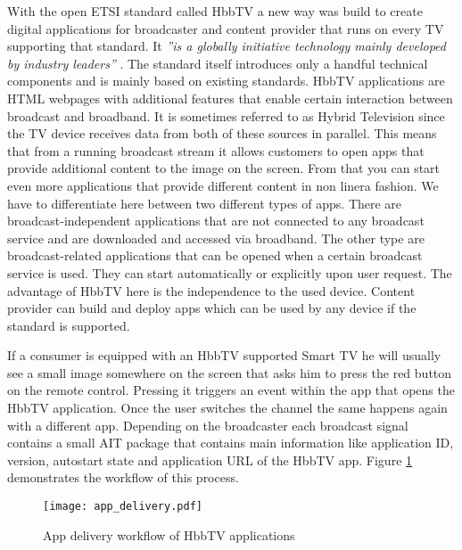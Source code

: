 With the open ETSI standard called HbbTV a new way was build to create digital applications for
broadcaster and content provider that runs on every TV supporting that standard. It \textit{''is
a globally initiative technology mainly developed by industry leaders''} \cite{zte}. The standard
itself introduces only a handful technical components and is mainly based on existing standards. HbbTV
applications are HTML webpages with additional features that enable certain interaction between
broadcast and broadband. It is sometimes referred to as Hybrid Television since the TV device receives
data from both of these sources in parallel. This means that from a running broadcast stream it allows
customers to open apps that provide additional content to the image on the screen. From that you can start
even more applications that provide different content in non linera fashion. We have to differentiate
here between two different types of apps. There are broadcast-independent applications that are not
connected to any broadcast service and are downloaded and accessed via broadband. The other type are
broadcast-related applications that can be opened when a certain broadcast service is used. They
can start automatically or explicitly upon user request. The advantage of HbbTV here is the independence
to the used device. Content provider can build and deploy apps which can be used by any device if the
standard is supported.

If a consumer is equipped with an HbbTV supported Smart TV he will usually see a small image somewhere
on the screen that asks him to press the red button on the remote control. Pressing it triggers an
event within the app that opens the HbbTV application. Once the user switches the channel the same
happens again with a different app. Depending on the broadcaster each broadcast signal contains
a small AIT package that contains main information like application ID, version, autostart state and
application URL of the HbbTV app. Figure \ref{fig:app_delivery} demonstrates the workflow of this
process.

\begin{figure}[htb]
  \centering
  \texttt{[image: app\_delivery.pdf]}\\
  \caption{App delivery workflow of HbbTV applications}\label{fig:app_delivery}
\end{figure}

